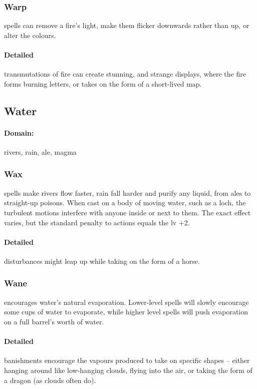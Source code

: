 \begin{multicols}{2}
\subsubsection{Warp}
spells can remove a fire's light, make them flicker downwards rather than up, or alter the colours.

\paragraph{Detailed}
transmutations of fire can create stunning, and strange displays, where the fire forms burning letters, or takes on the form of a short-lived map.

\subsection{Water}
\paragraph{Domain:}
rivers, rain, ale, magma

\subsubsection{Wax}
spells make rivers flow faster, rain fall harder and purify any liquid, from ales to straight-up poisons.
When cast on a body of moving water, such as a loch, the turbulent motions interfere with anyone inside or next to them.
The exact effect varies, but the standard penalty to actions equals the \gls{lv} +2.

\paragraph{Detailed}
disturbances might leap up while taking on the form of a horse.

\subsubsection{Wane}
encourages water's natural evaporation.
Lower-level spells will slowly encourage some cups of water to evaporate, while higher level spells will push evaporation on a full barrel's worth of water.

\paragraph{Detailed}
banishments encourage the vapours produced to take on specific shapes -- either hanging around like low-hanging clouds, flying into the air, or taking the form of a dragon (as clouds often do).


\end{multicols}

